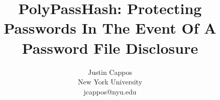 \documentclass[letterpaper,twocolumn,10pt]{article}
\begin{document}
\date{}

\title{PolyPassHash: Protecting Passwords In The Event Of A Password File 
Disclosure}


\newcommand{\showurlx}{{\url{https://polypasshash.poly.edu}}}

\author{
{\rm Justin Cappos}\\
New York University\\
jcappos@nyu.edu
} 

\maketitle

\thispagestyle{empty}






















%






\dmyyyydate
{\footnotesize 
}

\end{document}
